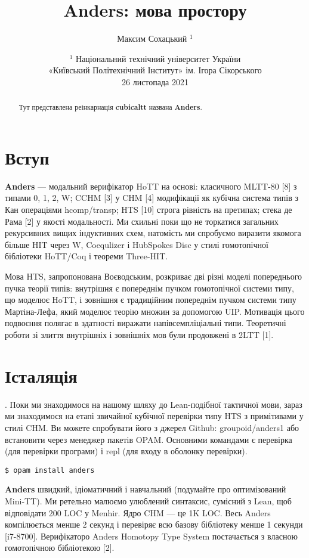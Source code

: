\documentclass{article}
\theoremstyle{definition}
\begin{document}
\title{Anders: мова простору}
\author{Максим Сохацький $^1$}
\date{ \small $^1$ Національний технічний університет України \\
       «Київський Політехнічний Інститут» ім. Ігора Сікорського \\
       26 листопада 2021 }
\maketitle

\begin{abstract}
Тут представлена реінкарнація \textbf{cubicaltt} названа \textbf{Anders}.
\end{abstract}

\section*{Вступ}

\textbf{Anders} — модальний верифікатор HoTT на основі: класичного MLTT-80 [8]
з типами 0, 1, 2, W; CCHM [3] у CHM [4] модифікації як кубічна
система типів з Кан операціями hcomp/transp; HTS [10] строга рівність
на претипах; стека де Рама [2] у якості модальності. Ми схильні поки
що не торкатися загальних рекурсивних вищих індуктивних схем,
натомість ми спробуємо виразити якомога більше HIT через W, Coequlizer
і HubSpokes Disc у стилі гомотопічної бібліотеки HoTT/Coq і теореми Three-HIT.

Мова HTS, запропонована Воєводським, розкриває дві різні моделі
попереднього пучка теорії типів: внутрішня є попереднім пучком
гомотопічної системи типу, що моделює HoTT, і зовнішня є традиційним
попереднім пучком системи типу Мартіна-Лефа, який моделює теорію множин
за допомогою UIP. Мотивація цього подвоєння полягає в здатності виражати
напівсемпліціальні типи. Теоретичні роботи зі злиття внутрішніх і
зовнішніх мов були продовжені в 2LTT [1].

\newpage
\section{Істаляція}. Поки ми знаходимося на нашому шляху до Lean-подібної
тактичної мови, зараз ми знаходимося на етапі звичайної кубічної перевірки
типу HTS з примітивами у стилі CHM. Ви можете спробувати його з джерел
Github: groupoid/anders1 або встановити через менеджер пакетів OPAM.
Основними командами є перевірка (для перевірки програми) і repl (для входу в оболонку перевірки).
\begin{lstlisting}
$ opam install anders
\end{lstlisting}

\textbf{Anders} швидкий, ідіоматичний і навчальний (подумайте про оптимізований Mini-TT).
Ми ретельно малюємо улюблений синтаксис, сумісний з Lean, щоб відповідати 200
LOC у Menhir. Ядро CHM — це 1K LOC. Весь Anders компілюється менше 2 секунд і
перевіряє всю базову бібліотеку менше 1 секунди [i7-8700]. Верифікаторо Anders
Homotopy Type System постачається з власною гомотопічною бібліотекою [2].
\end{document}
